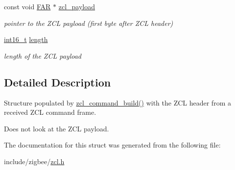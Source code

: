 \begin{DoxyCompactItemize}
const void \hyperlink{group__hal_gaef060b3456fdcc093a7210a762d5f2ed}{F\+AR} $\ast$ \hyperlink{group__zcl_gaf0e34793a3febabcdb61c020aecbf805}{zcl\+\_\+payload}
\begin{DoxyCompactList}\small\item\em pointer to the Z\+CL payload (first byte after Z\+CL header) \end{DoxyCompactList}\item 
\hyperlink{group__hal__dos_ga2140805d08462d474b82ddc8d1c2f3e6}{int16\+\_\+t} \hyperlink{group__zcl_ga0ff9f63e333676ba1359f505d02dd281}{length}
\begin{DoxyCompactList}\small\item\em length of the Z\+CL payload \end{DoxyCompactList}\end{DoxyCompactItemize}


\subsection{Detailed Description}
Structure populated by \hyperlink{group__zcl_gadeb35ab493fffec9ba1c33f658929136}{zcl\+\_\+command\+\_\+build()} with the Z\+CL header from a received Z\+CL command frame. 

Does not look at the Z\+CL payload. 

The documentation for this struct was generated from the following file\+:\begin{DoxyCompactItemize}
\item 
include/zigbee/\hyperlink{zcl_8h}{zcl.\+h}\end{DoxyCompactItemize}
